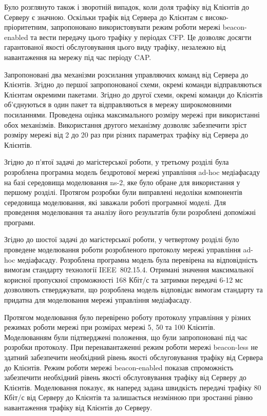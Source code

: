 \documentclass[a4paper,ukrainian,utf8,nocolumnsxix,nocolumnxxxii,nocolumnxxxi,floatsection,equationsection]{eskdtext}
\newcommand{\iee}[0]{IEEE~802.15.4\xspace}
\newcommand{\blm}[0]{beacon-less\xspace}
\newcommand{\bem}[0]{beacon-enabled\xspace}
\begin{document}
Було розглянуто також і зворотній випадок, коли доля трафіку від Клієнтів до Серверу є значною. Оскільки трафік від Сервера до Клієнтам є високо-пріоритетним, запропоновано використовувати режим роботи мережі \bem та вести передачу цього трафіку у періодах CFP. Це дозволяє досягти гарантованої якості обслуговування цього виду трафіку, незалежно від навантаження на мережу під час періоду CAP.

Запропоновані два механізми розсилання управляючих команд від Сервера до Клієнтів. Згідно до першої запропонованої схеми, окремі команди відправляються Клієнтам окремими пакетами. Згідно до другої схеми, окремі команди до Клієнтів об’єднуються в один пакет та відправляються в мережу широкомовними посиланнями. Проведена оцінка максимального розміру мережі при використанні обох механізмів. Використання другого механізму дозволяє забезпечити зріст розміру мережі від 2 до 20 раз при різних параметрах трафіку від Сервера до Клієнтів.

Згідно до п’ятої задачі до магістерської роботи, у третьому розділі була розроблена програмна модель бездротової мережі управління ad-hoc медіафасаду на базі середовища моделювання ns-2, яке було обране для використання у першому розділі. Протягом розробки були виправлені недоліки компонентів середовища моделювання, які заважали роботі програмної моделі. Для проведення моделювання та аналізу його результатів були розроблені допоміжні програми. 

Згідно до шостої задачі до магістерської роботи, у четвертому розділі було проведене моделювання роботи розробленого протоколу мережі управління ad-hoc медіафасаду. Розроблена програмна модель була перевірена на відповідність вимогам стандарту технології \iee. Отримані значення максимальної корисної пропускної спроможності 168 Кбіт/с та затримки передачі 6-12 мс дозволяють стверджувати, що розроблена модель відповідає вимогам стандарту та придатна для моделювання мережі управління медіафасаду. 

Протягом моделювання було перевірено роботу протоколу управління у різних режимах роботи мережі при розмірах мережі 5, 50 та 100 Клієнтів. Моделюванням були підтверджені положення, що були запропоновані під час розробки протоколу. При перенавантаженні режим роботи мережі \blm не здатний забезпечити необхідний рівень якості обслуговування трафіку від Сервера до Клієнтів. Режим роботи мережі \bem показав спроможність забезпечити необхідний рівень якості обслуговування трафіку від Серверу до Клієнтів. Моделювання показує, як наперед задана швидкість передачі трафіку 80 Кбіт/с від Серверу до Клієнтів та залишається незмінною при зростанні рівню навантаження трафіку від Клієнтів до Серверу.
\end{document}
